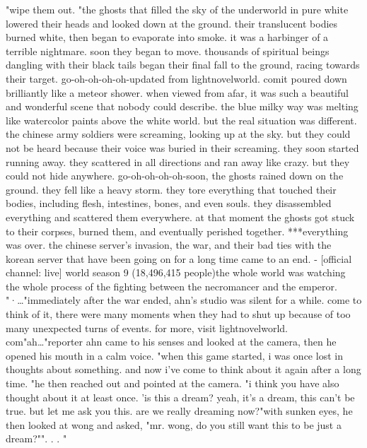"wipe them out.
"the ghosts that filled the sky of the underworld in pure white lowered their heads and looked down at the ground.
 their translucent bodies burned white, then began to evaporate into smoke.
 it was a harbinger of a terrible nightmare.
soon they began to move.
 thousands of spiritual beings dangling with their black tails began their final fall to the ground, racing towards their target.
go-oh-oh-oh-oh-updated from lightnovelworld.
comit poured down brilliantly like a meteor shower.
 when viewed from afar, it was such a beautiful and wonderful scene that nobody could describe.
 the blue milky way was melting like watercolor paints above the white world.
but the real situation was different.
the chinese army soldiers were screaming, looking up at the sky.
 but they could not be heard because their voice was buried in their screaming.
 they soon started running away.
 they scattered in all directions and ran away like crazy.
but they could not hide anywhere.
 go-oh-oh-oh-oh-soon, the ghosts rained down on the ground.
 they fell like a heavy storm.
 they tore everything that touched their bodies, including flesh, intestines, bones, and even souls.
they disassembled everything and scattered them everywhere.
at that moment the ghosts got stuck to their corpses, burned them, and eventually perished together.
***everything was over.
 the chinese server's invasion, the war, and their bad ties with the korean server that have been going on for a long time came to an end.
- [official channel: live] world season 9 (18,496,415 people)the whole world was watching the whole process of the fighting between the necromancer and the emperor.
"·…"immediately after the war ended, ahn's studio was silent for a while.
come to think of it, there were many moments when they had to shut up because of too many unexpected turns of events.
for more, visit lightnovelworld.
c‌om"ah…"reporter ahn came to his senses and looked at the camera, then he opened his mouth in a calm voice.
 "when this game started, i was once lost in thoughts about something.
 and now i've come to think about it again after a long time.
"he then reached out and pointed at the camera.
"i think you have also thought about it at least once.
 'is this a dream? yeah, it's a dream, this can't be true.
 but let me ask you this.
 are we really dreaming now?"with sunken eyes, he then looked at wong and asked, "mr.
 wong, do you still want this to be just a dream?"".
.
.
"

